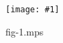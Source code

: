 \documentclass[a4paper]{ctexart}
\newcommand{\fig}[1]{
\begin{figure} \begin{center}
	\texttt{[image: \#1]}
	\caption{#1}
	\label{#1}
\end{center} \end{figure}
}
\begin{document}
\fig{fig-1.mps}
\end{document}
